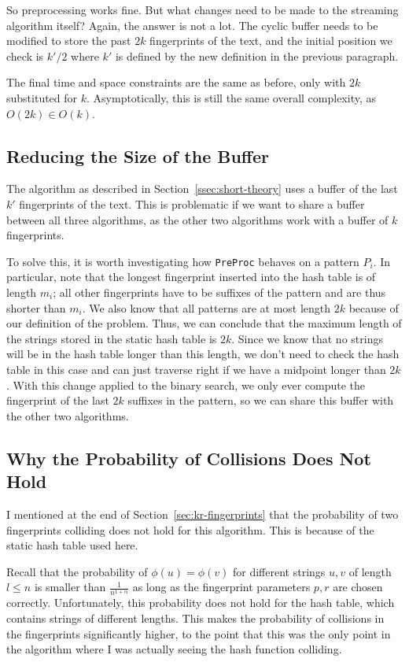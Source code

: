 \documentclass[ %
                    author={Dominic Joseph Moylett},
                    degree={MEng},
                     title={Dictionary Matching with Fingerprints},
                  subtitle={An Empirical Analysis},
                      type={research},
                      year={2015} ]{dissertation}
\begin{document}
So preprocessing works fine. But what changes need to be made to the streaming algorithm itself? Again, the answer is not a lot. The cyclic buffer needs to be modified to store the past $2k$ fingerprints of the text, and the initial position we check is $k'/2$ where $k'$ is defined by the new definition in the previous paragraph.

The final time and space constraints are the same as before, only with $2k$ substituted for $k$. Asymptotically, this is still the same overall complexity, as $O(2k) \in O(k)$.

\subsection{Reducing the Size of the Buffer}

The algorithm as described in Section~\ref{ssec:short-theory} uses a buffer of the last $k'$ fingerprints of the text. This is problematic if we want to share a buffer between all three algorithms, as the other two algorithms work with a buffer of $k$ fingerprints.

To solve this, it is worth investigating how \texttt{PreProc} behaves on a pattern $P_i$. In particular, note that the longest fingerprint inserted into the hash table is of length $m_i$; all other fingerprints have to be suffixes of the pattern and are thus shorter than $m_i$. We also know that all patterns are at most length $2k$ because of our definition of the problem. Thus, we can conclude that the maximum length of the strings stored in the static hash table is $2k$. Since we know that no strings will be in the hash table longer than this length, we don't need to check the hash table in this case and can just traverse right if we have a midpoint longer than $2k$. With this change applied to the binary search, we only ever compute the fingerprint of the last $2k$ suffixes in the pattern, so we can share this buffer with the other two algorithms.

\subsection{Why the Probability of Collisions Does Not Hold}
\label{ssec:short-collisions}

I mentioned at the end of Section~\ref{sec:kr-fingerprints} that the probability of two fingerprints colliding does not hold for this algorithm. This is because of the static hash table used here.

Recall that the probability of $\phi(u) = \phi(v)$ for different strings $u, v$ of length $l \leq n$ is smaller than $\frac{1}{n^{1 + \alpha}}$ as long as the fingerprint parameters $p, r$ are chosen correctly. Unfortunately, this probability does not hold for the hash table, which contains strings of different lengths. This makes the probability of collisions in the fingerprints significantly higher, to the point that this was the only point in the algorithm where I was actually seeing the hash function colliding.
\end{document}
